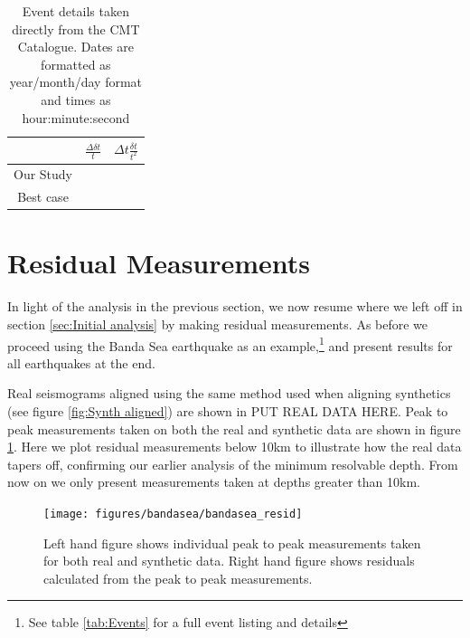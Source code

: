\documentclass[11pt,a4paper]{article}
\begin{document}
\begin{table}
\centering
\begin{tabular}{| c | c | c |}
	\hline
	 		& $\frac{\Delta \delta t}{t}$	& $\Delta t \frac{\delta t}{t^{2}}$	\\ \hline
	Our Study	& 					&		 				\\\hline
	Best case	&					&						\\
	\hline
\end{tabular}
\caption{Event details taken directly from the CMT Catalogue. Dates are formatted as year/month/day format and times as hour:minute:second}
\end{table}

\section{Residual Measurements}

In light of the analysis in the previous section, we now resume where we left off in section \ref{sec:Initial analysis} by making residual measurements. As before we proceed using the Banda Sea earthquake as an example,\footnote{See table \ref{tab:Events} for a full event listing and details} and present results for all earthquakes at the end.

Real seismograms aligned using the same method used when aligning synthetics (see figure \ref{fig:Synth aligned}) are shown in PUT REAL DATA HERE. Peak to peak measurements taken on both the real and synthetic data are shown in figure \ref{fig:Bandasea residuals}. Here we plot residual measurements below 10km to illustrate how the real data tapers off, confirming our earlier analysis of the minimum resolvable depth. From now on we only present measurements taken at depths greater than 10km.

\begin{figure}
	\centering
	\texttt{[image: figures/bandasea/bandasea\_resid]}
	\caption{Left hand figure shows individual peak to peak measurements taken for both real and synthetic data. Right hand figure shows residuals calculated from the peak to peak measurements.}
	\label{fig:Bandasea residuals}
\end{figure}

\appendix
\end{document}
